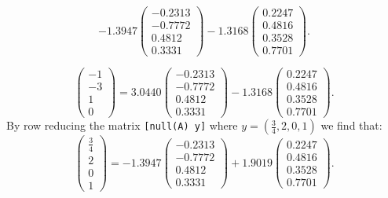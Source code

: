 \documentclass{ximera}
\begin{document}
\begin{computerExercise}
\begin{solution}
\[
-1.3947\left(\begin{array}{r} -0.2313 \\ -0.7772 \\ 0.4812 \\ 0.3331 \end{array}\right) 
-1.3168\left(\begin{array}{r} 0.2247 \\ 0.4816 \\ 0.3528 \\ 0.7701 \end{array}\right).
\]


\[
\left(\begin{array}{r} -1 \\ -3 \\ 1 \\ 0 \end{array}\right) =
3.0440\left(\begin{array}{r} -0.2313 \\ -0.7772 \\ 0.4812 \\ 0.3331 \end{array}\right) 
-1.3168\left(\begin{array}{r} 0.2247 \\ 0.4816 \\ 0.3528 \\ 0.7701 \end{array}\right).
\]
By row reducing the matrix {\tt [null(A) y]} where $y = (\frac{3}{4},
2,0,1)$ we find that:
\[
\left(\begin{array}{r} \frac{3}{4} \\ 2 \\ 0 \\ 1 \end{array}\right) =
-1.3947\left(\begin{array}{r} -0.2313 \\ -0.7772 \\ 0.4812 \\ 0.3331 \end{array}\right) +
1.9019\left(\begin{array}{r} 0.2247 \\ 0.4816 \\ 0.3528 \\ 0.7701 \end{array}\right).
\]

\end{solution}
\end{computerExercise}
\end{document}
